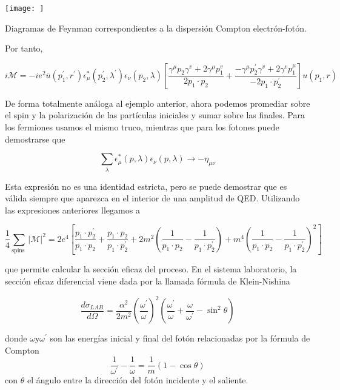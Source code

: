 \begin{marginfigure}[]
  \texttt{[image: ]}
  \caption[]{Diagramas de Feynman correspondientes a la dispersión Compton electrón-fotón.}
\end{marginfigure}

Por tanto,

\begin{equation*}
i \mathscr{M}=-i e^{2} \bar{u}\left(p_{1}^{\prime}, r^{\prime}\right) \epsilon_{\mu}^{*}\left(p_{2}^{\prime}, \lambda^{\prime}\right) \epsilon_{\nu}\left(p_{2}, \lambda\right)\left[\frac{\gamma^{\mu} p_{2} \gamma^{v}+2 \gamma^{\mu} p_{1}^{v}}{2 p_{1} \cdot p_{2}}+\frac{-\gamma^{\mu} p_{2}^{\prime} \gamma^{v}+2 \gamma^{v} p_{1}^{\mu}}{-2 p_{1} \cdot p_{2}^{\prime}}\right] u\left(p_{1}, r\right) \tag{8.31}
\end{equation*}


De forma totalmente análoga al ejemplo anterior, ahora podemos promediar sobre el spin y la polarización de las partículas iniciales y sumar sobre las finales. Para los fermiones usamos el mismo truco, mientras que para los fotones puede demostrarse que

\begin{equation*}
\sum_{\lambda} \epsilon_{\mu}^{*}(p, \lambda) \epsilon_{\nu}(p, \lambda) \rightarrow-\eta_{\mu \nu} \tag{8.32}
\end{equation*}


Esta expresión no es una identidad estricta, pero se puede demostrar que es válida siempre que aparezca en el interior de una amplitud de QED. Utilizando las expresiones anteriores llegamos a

\begin{equation*}
\frac{1}{4} \sum_{\text {spins }}|\mathscr{M}|^{2}=2 e^{4}\left[\frac{p_{1} \cdot p_{2}^{\prime}}{p_{1} \cdot p_{2}}+\frac{p_{1} \cdot p_{2}}{p_{1} \cdot p_{2}^{\prime}}+2 m^{2}\left(\frac{1}{p_{1} \cdot p_{2}}-\frac{1}{p_{1} \cdot p_{2}^{\prime}}\right)+m^{4}\left(\frac{1}{p_{1} \cdot p_{2}}-\frac{1}{p_{1} \cdot p_{2}^{\prime}}\right)^{2}\right] \tag{8.33}
\end{equation*}

que permite calcular la sección eficaz del proceso. En el sistema laboratorio, la sección eficaz diferencial viene dada por la llamada fórmula de Klein-Nishina

\begin{equation*}
\frac{d \sigma_{L A B}}{d \Omega}=\frac{\alpha^{2}}{2 m^{2}}\left(\frac{\omega^{\prime}}{\omega}\right)^{2}\left(\frac{\omega^{\prime}}{\omega}+\frac{\omega}{\omega^{\prime}}-\sin ^{2} \theta\right) \tag{8.34}
\end{equation*}

donde $\omega \mathrm{y} \omega^{\prime}$ son las energías inicial y final del fotón relacionadas por la fórmula de Compton
$$
\frac{1}{\omega^{\prime}}-\frac{1}{\omega}=\frac{1}{m}(1-\cos \theta)
$$
con $\theta$ el ángulo entre la dirección del fotón incidente y el saliente.